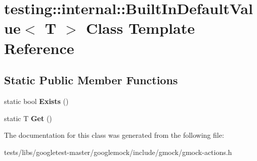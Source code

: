\hypertarget{classtesting_1_1internal_1_1BuiltInDefaultValue}{}\section{testing\+:\+:internal\+:\+:Built\+In\+Default\+Value$<$ T $>$ Class Template Reference}
\label{classtesting_1_1internal_1_1BuiltInDefaultValue}
\subsection*{Static Public Member Functions}
\begin{DoxyCompactItemize}
\item 
\mbox{\label{classtesting_1_1internal_1_1BuiltInDefaultValue_a35207bc20a493b0efb3980eb9a08dd2f}} 
static bool {\bfseries Exists} ()
\item 
\mbox{\label{classtesting_1_1internal_1_1BuiltInDefaultValue_a7e26c1df14a887c8f393b29d6ea162e6}} 
static T {\bfseries Get} ()
\end{DoxyCompactItemize}


The documentation for this class was generated from the following file\+:\begin{DoxyCompactItemize}
\item 
tests/libs/googletest-\/master/googlemock/include/gmock/gmock-\/actions.\+h\end{DoxyCompactItemize}
